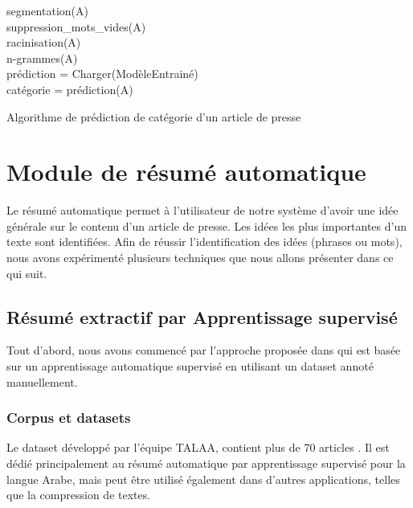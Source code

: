             \begin{algorithm2e}[H]
            \label{algoprediction}
            \SetAlgoLined
            segmentation(A)\\
            suppression\_mots\_vides(A)\\
            racinisation(A)\\
            n-grammes(A)\\
            prédiction = Charger(ModèleEntrainé)\\
            catégorie = prédiction(A)\\
            \caption{Algorithme de prédiction de catégorie d'un article de presse}
            \end{algorithm2e}

\section{Module de résumé automatique}
Le résumé automatique permet à l'utilisateur de notre système d'avoir une idée générale sur le contenu d'un article de presse. Les idées les plus importantes d'un texte sont identifiées. Afin de réussir l'identification des idées (phrases ou mots), nous avons expérimenté plusieurs techniques que nous allons présenter dans ce qui suit.

    \subsection{Résumé extractif par Apprentissage supervisé}
    Tout d'abord, nous avons commencé par l'approche proposée dans \cite{riad-belkbir} qui est basée sur un apprentissage automatique supervisé en utilisant un dataset annoté manuellement. 
        \subsubsection{Corpus et datasets}
        Le dataset développé par l'équipe TALAA, contient plus de 70 articles \cite{riad-belkbir}. Il est dédié principalement au résumé automatique par apprentissage supervisé pour la langue Arabe, mais peut être utilisé également dans d'autres applications, telles que la compression de textes.

